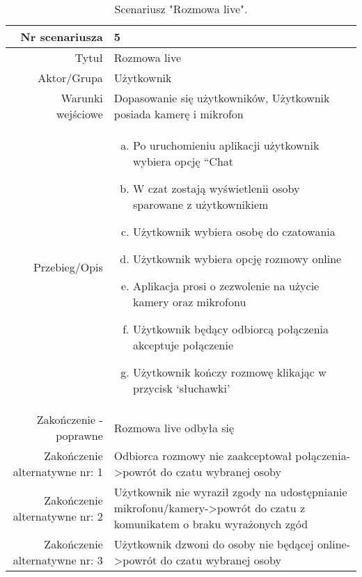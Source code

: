 \documentclass[12pt,a4paper]{article}
\begin{document}
\begin{table} [H]
\centering
\begin{tabular}{|r|p{9cm}|} \hline
Nr scenariusza & 5 \\
\hline
Tytuł & Rozmowa live \\
\hline
Aktor/Grupa & Użytkownik \\
\hline
Warunki wejściowe & Dopasowanie się użytkowników, Użytkownik posiada kamerę i mikrofon
 \\
\hline
Przebieg/Opis & 
\begin{enumerate}[a)]
\item Po uruchomieniu aplikacji użytkownik wybiera opcję “Chat
\item W czat zostają wyświetlenii osoby sparowane z użytkownikiem
\item Użytkownik wybiera  osobę do czatowania
\item Użytkownik wybiera opcję rozmowy online
\item Aplikacja prosi o zezwolenie na użycie kamery oraz mikrofonu
\item Użytkownik będący odbiorcą połączenia akceptuje połączenie
\item Użytkownik kończy rozmowę klikając w przycisk ‘słuchawki’
\end{enumerate}
\\
\hline
Zakończenie - poprawne & Rozmowa live odbyła się
\\ 
\hline
Zakończenie alternatywne nr: 1 & Odbiorca rozmowy nie zaakceptował połączenia->powrót do czatu wybranej osoby
\\
\hline
Zakończenie alternatywne nr: 2 & Użytkownik nie wyraził zgody na udostępnianie mikrofonu/kamery->powrót do czatu z komunikatem o braku wyrażonych zgód
\\
\hline
Zakończenie alternatywne nr: 3 & Użytkownik dzwoni do osoby nie będącej online->powrót do czatu wybranej osoby
\\
\hline
\end{tabular}
\caption{Scenariusz "Rozmowa live".}
\label{table:5}
\end{table}
\end{document}

